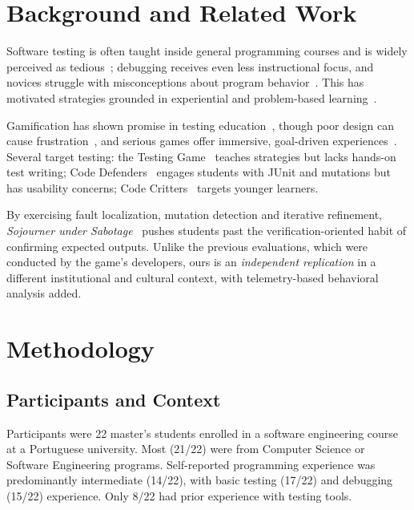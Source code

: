 \documentclass[conference]{IEEEtran}
\begin{document}
\section{Background and Related Work}
\label{sec:background}

Software testing is often taught inside general programming courses and is widely perceived as tedious~\cite{garousi2020testing, straubinger2023survey}; debugging receives even less instructional focus, and novices struggle with misconceptions about program behavior~\cite{mccauley2008debugging}. This has motivated strategies grounded in experiential and problem-based learning~\cite{kolb1984experiential, hmelo2004problem}.

Gamification has shown promise in testing education~\cite{blanco2023gamification}, though poor design can cause frustration~\cite{toda2017dark}, and serious games offer immersive, goal-driven experiences~\cite{connolly2012systematic}.
Several target testing: the Testing Game~\cite{valle2017testing} teaches strategies but lacks hands-on test writing; Code Defenders~\cite{fraser2019code} engages students with JUnit and mutations but has usability concerns; Code Critters~\cite{straubinger2023code} targets younger learners.

By exercising fault localization, mutation detection and iterative refinement, \emph{Sojourner under Sabotage}~\cite{straubinger2025sojourner} pushes students past the verification-oriented habit of confirming expected outputs. Unlike the previous evaluations, which were conducted by the game's developers, ours is an \emph{independent replication} in a different institutional and cultural context, with telemetry-based behavioral analysis added.

\section{Methodology}
\label{sec:methodology}

\subsection{Participants and Context}

Participants were 22 master's students enrolled in a software engineering course at a Portuguese university.
Most (21/22) were from Computer Science or Software Engineering programs.
Self-reported programming experience was predominantly intermediate (14/22), with basic testing (17/22) and debugging (15/22) experience.
Only 8/22 had prior experience with testing tools.
\end{document}
